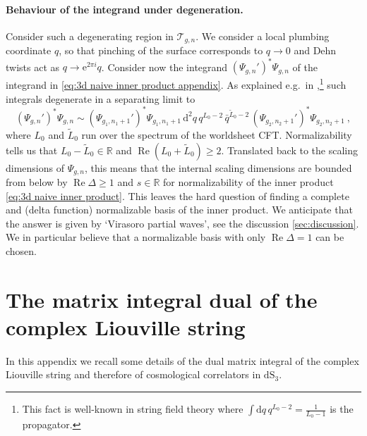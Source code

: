 \documentclass[12pt,a4paper]{article}
\newcommand{\be}{\begin{equation}}
\newcommand{\ee}{\end{equation}}
\renewcommand\Re{\mathop{\text{Re}}}
\newcommand\RR{\mathbb{R}}
\renewcommand\d{\text{d}}
\renewcommand{\ge}{\geqslant}
\begin{document}
\paragraph{Behaviour of the integrand under degeneration.} Consider such a degenerating region in $\mathcal{T}_{g,n}$. We consider a local plumbing coordinate $q$, so that pinching of the surface corresponds to $q \to 0$ and Dehn twists act as $q \to \mathrm{e}^{2\pi i} q$. 
 Consider now the integrand $(\Psi_{g,n}')^*\Psi_{g,n}$ of the integrand in \eqref{eq:3d naive inner product appendix}. As explained e.g.\ in \cite{Witten:2013tpa},\footnote{This fact is well-known in string field theory where $\int \d q \, q^{L_0-2}=\frac{1}{L_0-1}$ is the propagator.} such integrals degenerate in a separating limit to
\be 
(\Psi_{g,n}')^*\Psi_{g,n} \sim (\Psi_{g_1,n_1+1}')^*\Psi_{g_1,n_1+1}\,  \d^2 q\,  q^{L_0-2} \, \bar{q}^{\tilde{L}_0-2}\, (\Psi_{g_2,n_2+1}')^*\Psi_{g_2,n_2+1}~,
\ee
where $L_0$ and $\tilde{L}_0$ run over the spectrum of the worldsheet CFT. Normalizability tells us that $L_0-\tilde{L}_0 \in \RR$ and $\Re(L_0+\tilde{L}_0) \ge 2$. Translated back to the scaling dimensions of $\Psi_{g,n}$, this means that the internal scaling dimensions are bounded from below by $\Re \Delta \ge 1$ and $s \in \RR$ for normalizability of the inner product \eqref{eq:3d naive inner product}.
This leaves the hard question of finding a complete and (delta function) normalizable basis of the inner product. We anticipate that the answer is given by `Virasoro partial waves', see the discussion \ref{sec:discussion}. We in particular believe that a normalizable basis with only $\Re \Delta=1$ can be chosen.

\section{The matrix integral dual of the complex Liouville string}\label{app:matrix model dual}


In this appendix we recall some details of the dual matrix integral of the complex Liouville string \cite{paper2} and therefore of cosmological correlators in $\mathrm{dS}_3$. 
\end{document}

